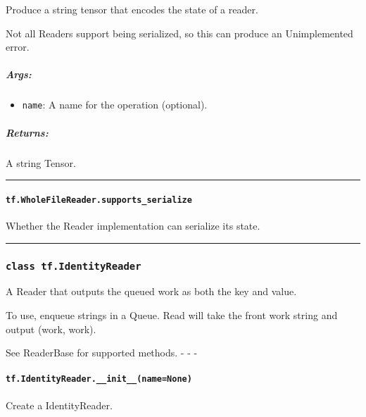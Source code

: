 Produce a string tensor that encodes the state of a reader.

Not all Readers support being serialized, so this can produce an
Unimplemented error.

\subparagraph{Args: }\label{args-21}

\begin{itemize}
\tightlist
\item
  \texttt{name}: A name for the operation (optional).
\end{itemize}

\subparagraph{Returns: }\label{returns-18}

A string Tensor.

\begin{center}\rule{0.5\linewidth}{\linethickness}\end{center}

\paragraph{\texorpdfstring{\texttt{tf.WholeFileReader.supports\_serialize}
}{tf.WholeFileReader.supports\_serialize }}\label{tf.wholefilereader.supportsux5fserialize}

Whether the Reader implementation can serialize its state.

\begin{center}\rule{0.5\linewidth}{\linethickness}\end{center}

\subsubsection{\texorpdfstring{\texttt{class\ tf.IdentityReader}
}{class tf.IdentityReader }}\label{class-tf.identityreader}

A Reader that outputs the queued work as both the key and value.

To use, enqueue strings in a Queue. Read will take the front work string
and output (work, work).

See ReaderBase for supported methods. - - -

\paragraph{\texorpdfstring{\texttt{tf.IdentityReader.\_\_init\_\_(name=None)}
}{tf.IdentityReader.\_\_init\_\_(name=None) }}\label{tf.identityreader.ux5fux5finitux5fux5fnamenone}

Create a IdentityReader.

